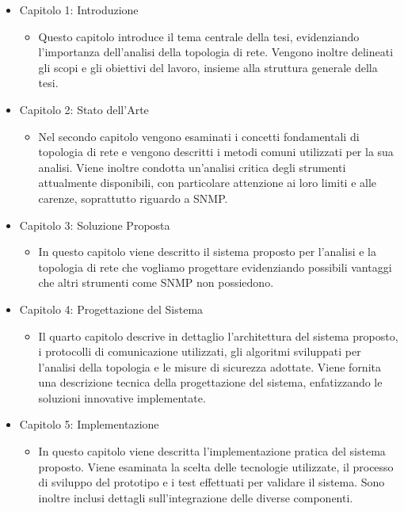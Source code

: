 \documentclass[target=bach,aauheader=,style=]{thud}
\begin{document}
\begin{itemize}
  \item Capitolo 1: Introduzione
  \begin{itemize}
    \item[] Questo capitolo introduce il tema centrale della tesi, evidenziando l'importanza dell'analisi della topologia di rete. Vengono inoltre delineati gli scopi e gli obiettivi del lavoro, insieme alla struttura generale della tesi.
  \end{itemize}

  \item Capitolo 2: Stato dell'Arte
    \begin{itemize}
      \item[] Nel secondo capitolo vengono esaminati i concetti fondamentali di topologia di rete e vengono descritti i metodi comuni utilizzati per la sua analisi. Viene inoltre condotta un'analisi critica degli strumenti attualmente disponibili, con particolare attenzione ai loro limiti e alle carenze, soprattutto riguardo a SNMP.
    \end{itemize}

  \item    Capitolo 3: Soluzione Proposta
    \begin{itemize}
      \item[] In questo capitolo viene descritto il sistema proposto per l'analisi e la topologia di rete che vogliamo progettare evidenziando possibili vantaggi che altri strumenti come SNMP non possiedono.
    \end{itemize}

  \item Capitolo 4: Progettazione del Sistema
    \begin{itemize}
      \item[] Il quarto capitolo descrive in dettaglio l'architettura del sistema proposto, i protocolli di comunicazione utilizzati, gli algoritmi sviluppati per l'analisi della topologia e le misure di sicurezza adottate. Viene fornita una descrizione tecnica della progettazione del sistema, enfatizzando le soluzioni innovative implementate.
    \end{itemize}

  \item Capitolo 5: Implementazione
    \begin{itemize}
      \item[] In questo capitolo viene descritta l'implementazione pratica del sistema proposto. Viene esaminata la scelta delle tecnologie utilizzate, il processo di sviluppo del prototipo e i test effettuati per validare il sistema. Sono inoltre inclusi dettagli sull'integrazione delle diverse componenti.
    \end{itemize}


\end{itemize}
\end{document}
